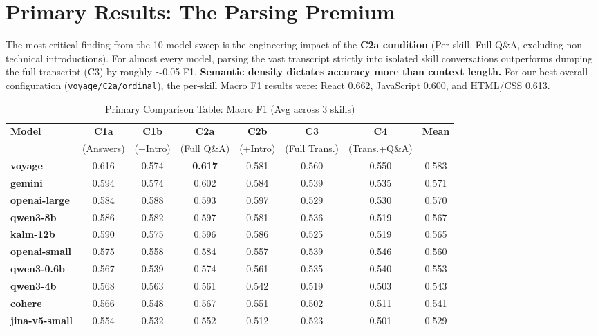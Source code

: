 \documentclass[11pt]{article}
\begin{document}
\section{Primary Results: The Parsing Premium}

The most critical finding from the 10-model sweep is the engineering impact of the \textbf{C2a condition} (Per-skill, Full Q\&A, excluding non-technical introductions). For almost every model, parsing the vast transcript strictly into isolated skill conversations outperforms dumping the full transcript (C3) by roughly $\sim$0.05 F1. \textbf{Semantic density dictates accuracy more than context length.} For our best overall configuration (\texttt{voyage/C2a/ordinal}), the per-skill Macro F1 results were: React 0.662, JavaScript 0.600, and HTML/CSS 0.613.

\begin{table}[htbp]
\centering
\caption{Primary Comparison Table: Macro F1 (Avg across 3 skills)}
\begin{tabular}{lccccccc}
\toprule
\textbf{Model} & \textbf{C1a} & \textbf{C1b} & \textbf{C2a} & \textbf{C2b} & \textbf{C3} & \textbf{C4} & \textbf{Mean} \\
& (Answers) & (+Intro) & (Full Q\&A) & (+Intro) & (Full Trans.) & (Trans.+Q\&A) & \\
\midrule
\textbf{voyage} & 0.616 & 0.574 & \textbf{0.617} & 0.581 & 0.560 & 0.550 & 0.583 \\
\textbf{gemini} & 0.594 & 0.574 & 0.602 & 0.584 & 0.539 & 0.535 & 0.571 \\
\textbf{openai-large} & 0.584 & 0.588 & 0.593 & 0.597 & 0.529 & 0.530 & 0.570 \\
\textbf{qwen3-8b} & 0.586 & 0.582 & 0.597 & 0.581 & 0.536 & 0.519 & 0.567 \\
\textbf{kalm-12b} & 0.590 & 0.575 & 0.596 & 0.586 & 0.525 & 0.519 & 0.565 \\
\textbf{openai-small} & 0.575 & 0.558 & 0.584 & 0.557 & 0.539 & 0.546 & 0.560 \\
\textbf{qwen3-0.6b} & 0.567 & 0.539 & 0.574 & 0.561 & 0.535 & 0.540 & 0.553 \\
\textbf{qwen3-4b} & 0.568 & 0.563 & 0.561 & 0.542 & 0.519 & 0.503 & 0.543 \\
\textbf{cohere} & 0.566 & 0.548 & 0.567 & 0.551 & 0.502 & 0.511 & 0.541 \\
\textbf{jina-v5-small} & 0.554 & 0.532 & 0.552 & 0.512 & 0.523 & 0.501 & 0.529 \\
\bottomrule
\end{tabular}
\end{table}
\end{document}
